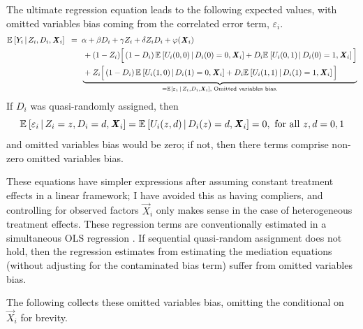 The ultimate regression equation leads to the following expected values, with omitted variables bias coming from the correlated error term, $\varepsilon_i$.
\begin{align*}
    \mathbb{E}_{} \left[ Y_i \, \middle\vert \, Z_i, D_i, \boldsymbol{\mathit{X}}_i \right] \;\; =& \;\;
        \alpha
        + \beta D_i
        + \gamma Z_i
        + \delta Z_i D_i
        + \varphi(\boldsymbol{\mathit{X}}_i) \\
        & \;\; \underbrace{\begin{aligned} &+(1-Z_i) \Big[
            \left( 1 - D_i \right) \mathbb{E}_{} \left[  U_i(0,0)  \, \middle\vert \, D_i(0) = 0, \boldsymbol{\mathit{X}}_i \right]
            + D_i \mathbb{E}_{} \left[  U_i(0,1)  \, \middle\vert \, D_i(0) = 1, \boldsymbol{\mathit{X}}_i \right]\Big] \\
        & + Z_i \Big[
            \left( 1 - D_i \right) \mathbb{E}_{} \left[  U_i(1,0)  \, \middle\vert \, D_i(1) = 0, \boldsymbol{\mathit{X}}_i \right]
            + D_i \mathbb{E}_{} \left[  U_i(1,1)  \, \middle\vert \, D_i(1) = 1, \boldsymbol{\mathit{X}}_i \right]\Big]
        \end{aligned}}_{
                = \mathbb{E}_{} \left[ \varepsilon_i \, \middle\vert \, Z_i, D_i, \boldsymbol{\mathit{X}}_i \right]\text{, Omitted variables bias.}
            }
\end{align*}
If $D_i$ was quasi-randomly assigned, then
\[ \mathbb{E}_{} \left[  \varepsilon_i  \, \middle\vert \, Z_i =z, D_i = d, \boldsymbol{\mathit{X}}_i \right] = \mathbb{E}_{} \left[  U_i(z,d)  \, \middle\vert \, D_i(z) = d, \boldsymbol{\mathit{X}}_i \right] = 0, \text{ for all $z,d=0,1$} \]
and omitted variables bias would be zero; if not, then there terms comprise non-zero omitted variables bias.

These equations have simpler expressions after assuming constant treatment effects in a linear framework;
I have avoided this as having compliers, and controlling for observed factors $\vec X_i$ only makes sense in the case of heterogeneous treatment effects.
These regression terms are conventionally estimated in a simultaneous OLS regression \citep{imai2010identification}.
If sequential quasi-random assignment does not hold, then the regression estimates from estimating the mediation equations (without adjusting for the contaminated bias term) suffer from omitted variables bias.

The following collects these omitted variables bias, omitting the conditional on $\vec X_i$ for brevity.

